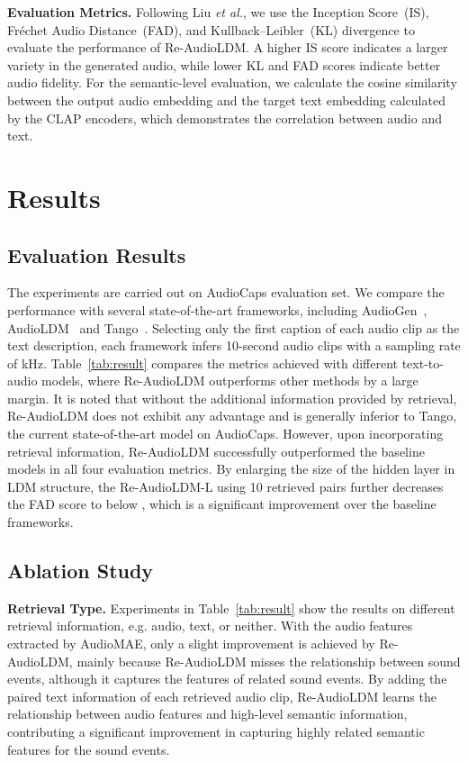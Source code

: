 \documentclass{article}
\begin{document}
\noindent
\textbf{Evaluation Metrics.}
Following Liu \textit{et al.}, we use the Inception Score~(IS), Fréchet Audio Distance~(FAD), and Kullback–Leibler~(KL) divergence to evaluate the performance of Re-AudioLDM. A higher IS score indicates a larger variety in the generated audio, while lower KL and FAD scores indicate better audio fidelity. For the semantic-level evaluation, we calculate the cosine similarity between the output audio embedding and the target text embedding calculated by the CLAP encoders, which demonstrates the correlation between audio and text.

\section{Results}
\label{sec:result}

\subsection{Evaluation Results}
The experiments are carried out on AudioCaps evaluation set. We compare the performance with several state-of-the-art frameworks, including AudioGen~\cite{audiogen}, AudioLDM~\cite{audioldm} and Tango~\cite{tango}. Selecting only the first caption of each audio clip as the text description, each framework infers  10-second audio clips with a sampling rate of  kHz. Table~\ref{tab:result} compares the metrics achieved with different text-to-audio models, where Re-AudioLDM outperforms other methods by a large margin. It is noted that without the additional information provided by retrieval, Re-AudioLDM does not exhibit any advantage and is generally inferior to Tango, the current state-of-the-art model on AudioCaps. However, upon incorporating retrieval information, Re-AudioLDM successfully outperformed the baseline models in all four evaluation metrics. By enlarging the size of the hidden layer in LDM structure, the Re-AudioLDM-L using 10 retrieved pairs further decreases the FAD score to below , which is a significant improvement over the baseline frameworks. 

\subsection{Ablation Study}
\label{ablation}
\textbf{Retrieval Type.}
Experiments in Table~\ref{tab:result} show the results on different retrieval information, e.g. audio, text, or neither. With the audio features extracted by AudioMAE, only a slight improvement is achieved by Re-AudioLDM, mainly because Re-AudioLDM misses the relationship between sound events, although it captures the features of related sound events. By adding the paired text information of each retrieved audio clip, Re-AudioLDM learns the relationship between audio features and high-level semantic information, contributing a significant improvement in capturing highly related semantic features for the sound events. 
\end{document}
